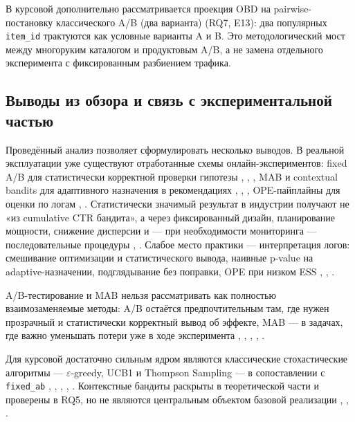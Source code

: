 В курсовой дополнительно рассматривается проекция OBD на pairwise-постановку классического A/B (два варианта) (RQ7, E13): два популярных \texttt{item\_id} трактуются как условные варианты A и B. Это методологический мост между многоруким каталогом и продуктовым A/B, а не замена отдельного эксперимента с фиксированным разбиением трафика.

\subsection{Выводы из обзора и связь с экспериментальной частью}\label{ux432ux44bux432ux43eux434ux44b-ux438ux437-ux43eux431ux437ux43eux440ux430-ux438-ux441ux432ux44fux437ux44c-ux441-ux44dux43aux441ux43fux435ux440ux438ux43cux435ux43dux442ux430ux43bux44cux43dux43eux439-ux447ux430ux441ux442ux44cux44e}

Проведённый анализ позволяет сформулировать несколько выводов. В реальной эксплуатации уже существуют отработанные схемы онлайн-экспериментов: fixed A/B для статистически корректной проверки гипотезы \cite{ref5}, \cite{ref10}, \cite{ref40}, MAB и contextual bandits для адаптивного назначения в рекомендациях \cite{ref6}, \cite{ref12}, \cite{ref37}, OPE-пайплайны для оценки по логам \cite{ref24}, \cite{ref26}. Статистически значимый результат в индустрии получают не «из cumulative CTR бандита», а через фиксированный дизайн, планирование мощности, снижение дисперсии и --- при необходимости мониторинга --- последовательные процедуры \cite{ref7}, \cite{ref19}. Слабое место практики --- интерпретация логов: смешивание оптимизации и статистического вывода, наивные p-value на adaptive-назначении, подглядывание без поправки, OPE при низком ESS \cite{ref11}, \cite{ref18}, \cite{ref21}.

A/B-тестирование и MAB нельзя рассматривать как полностью взаимозаменяемые методы: A/B остаётся предпочтительным там, где нужен прозрачный и статистически корректный вывод об эффекте, MAB --- в задачах, где важно уменьшать потери уже в ходе эксперимента \cite{ref5}, \cite{ref12}, \cite{ref18}, \cite{ref19}, \cite{ref20}.

Для курсовой достаточно сильным ядром являются классические стохастические алгоритмы --- $\varepsilon$-greedy, UCB1 и Thompson Sampling --- в сопоставлении с \texttt{fixed\_ab} \cite{ref4}, \cite{ref8}, \cite{ref9}, \cite{ref13}, \cite{ref17}. Контекстные бандиты раскрыты в теоретической части и проверены в RQ5, но не являются центральным объектом базовой реализации \cite{ref6}, \cite{ref15}, \cite{ref17}.

